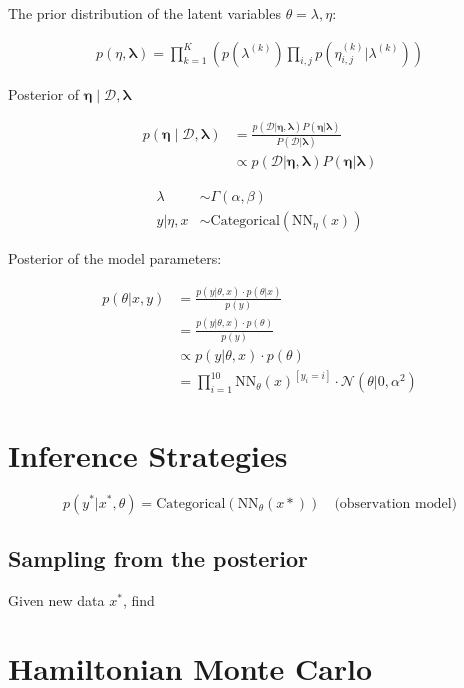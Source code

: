 The prior distribution of the latent variables $\theta = \lambda, \eta$: 

\begin{align*}
    p(\eta, \bm \lambda) =  \prod_{k=1}^K \left( p(\lambda^{(k)}) \prod_{i,j} p(\eta_{i,j}^{(k)}|\lambda^{(k)})\right)
\end{align*}


Posterior of $\bm \eta \mid \mathcal D, \bm \lambda$

\begin{align*}
    p(\bm \eta \mid \mathcal D,\bm \lambda) &=
    \frac
    {p(\mathcal D|\bm \eta,\bm \lambda)P(\bm \eta | \bm \lambda)}
    {P(\mathcal D|\bm \lambda)} \\
    &\propto p(\mathcal D|\bm \eta,\bm \lambda)P(\bm \eta | \bm \lambda)
\end{align*}


\begin{align*}
    \lambda &\sim \Gamma (\alpha, \beta)\\
    y | \eta, x &\sim \text{Categorical}(\text{NN}_\eta(x))
\end{align*}

Posterior of the model parameters:
    
\begin{align*}
    p(\theta | x, y) &= \frac{p(y |\theta, x) \cdot p(\theta|x)}{p(y) } \\
                     &= \frac{p(y |\theta, x) \cdot p(\theta)}{p(y) } \\
                     &\propto p(y |\theta, x) \cdot p(\theta) \\
                     &=\prod_{i=1}^{10}\text{NN}_\theta(x)^{[ y_i = i]} \cdot \mathcal{N}(\theta | 0, \alpha^2)
\end{align*}



\section{Inference Strategies}

$$
p(y^\ast | x^\ast, \theta ) = \text{Categorical}(\text{NN}_\theta(x\ast)) \quad \text{(observation model)}
$$

\subsection{Sampling from the posterior}

Given new data $x^\ast$, find 

\section{Hamiltonian Monte Carlo}

